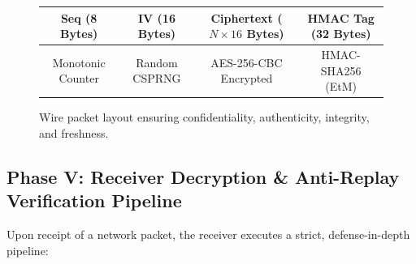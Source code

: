 \documentclass[11pt,a4paper]{article}
\begin{document}
\begin{figure}[H]
    \centering
    \begin{tcolorbox}[colback=codebg, colframe=bordercolor, width=0.95\linewidth, center]
    \centering\footnotesize\ttfamily
    \begin{tabular}{|c|c|c|c|}
    \hline
    \textbf{Seq (8 Bytes)} & \textbf{IV (16 Bytes)} & \textbf{Ciphertext ($N \times 16$ Bytes)} & \textbf{HMAC Tag (32 Bytes)} \\
    \hline
    Monotonic Counter & Random CSPRNG & AES-256-CBC Encrypted & HMAC-SHA256 (EtM) \\
    \hline
    \end{tabular}
    \end{tcolorbox}
    \caption{Wire packet layout ensuring confidentiality, authenticity, integrity, and freshness.}
    \label{fig:packet_structure}
\end{figure}

\subsection{Phase V: Receiver Decryption \& Anti-Replay Verification Pipeline}
Upon receipt of a network packet, the receiver executes a strict, defense-in-depth pipeline:
\end{document}
